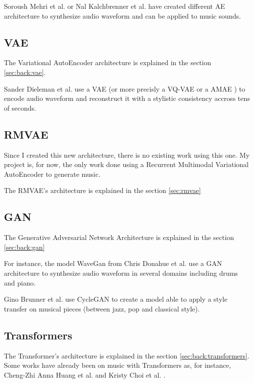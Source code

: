 \documentclass[12pt]{report}
\begin{document}
Soroush Mehri et al. \cite{mehri_samplernn_2017} or Nal Kalchbrenner et al. \cite{kalchbrenner_efficient_2018} have created different AE architecture to synthesize audio waveform and can be applied to music sounds.

\subsection{VAE}

The Variational AutoEncoder architecture is explained in the section \ref{sec:back:vae}. 

Sander Dieleman et al. \cite{dieleman_challenge_2018} use a VAE (or more precisly a VQ-VAE \cite{van_den_oord_neural_2017}  or a AMAE \cite{dieleman_challenge_2018}) to encode audio waveform and reconstruct it with a stylistic consistency accross tens of seconds.


\subsection{RMVAE}

Since I created this new architecture, there is no existing work using this one.
My project is, for now, the only work done using a Recurrent Multimodal Variational AutoEncoder to generate music.

The RMVAE's architecture is explained in the section \ref{sec:rmvae}

\subsection{GAN}

The Generative Adversarial Network Architecture is explained in the section \ref{sec:back:gan}

For instance, the model WaveGan from Chris Donahue et al. \cite{donahue_adversarial_2019} use a GAN architecture to synthesize audio waveform in several domains including drums and piano.

Gino Brunner et al. \cite{brunner_symbolic_2018} use CycleGAN \cite{zhu_unpaired_2018} to create a model able to apply a style transfer on musical pieces (between jazz, pop and classical style).

\subsection{Transformers}

The Transformer's architecture is explained in the section \ref{sec:back:transformers}.
Some works have already been on music with Transformers as, for instance, Cheng-Zhi Anna Huang et al. \cite{huang_music_2018} and Kristy Choi et al. \cite{choi_encoding_2019}.
\end{document}
